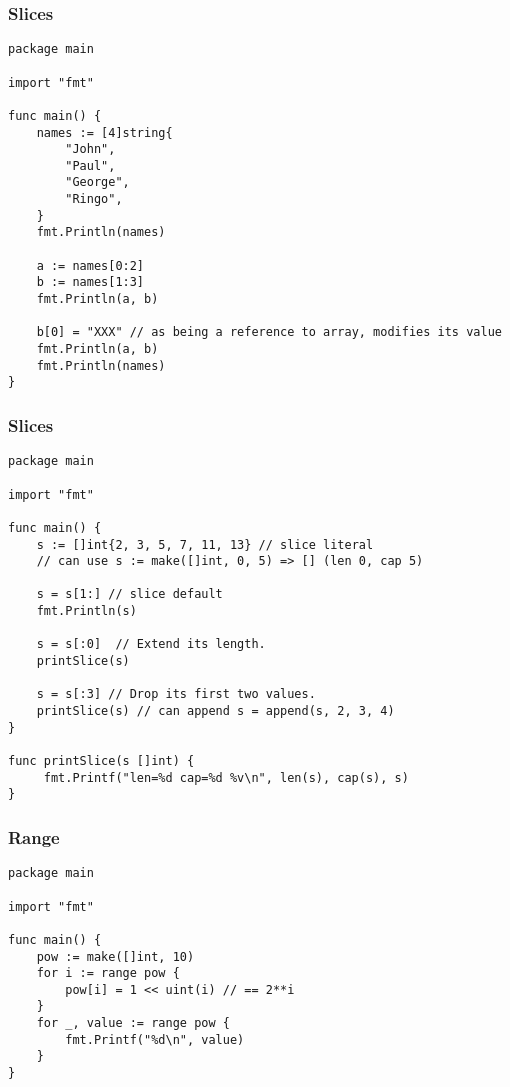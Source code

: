 \begin{frame}[fragile]
\frametitle{Slices}

\begin{lstlisting}
package main

import "fmt"

func main() {
    names := [4]string{
        "John",
        "Paul",
        "George",
        "Ringo",
    }
    fmt.Println(names)

    a := names[0:2]
    b := names[1:3]
    fmt.Println(a, b)

    b[0] = "XXX" // as being a reference to array, modifies its value
    fmt.Println(a, b)
    fmt.Println(names)
}
\end{lstlisting}

\end{frame}


\begin{frame}[fragile]
\frametitle{Slices}

\begin{lstlisting}
package main

import "fmt"

func main() {
    s := []int{2, 3, 5, 7, 11, 13} // slice literal
    // can use s := make([]int, 0, 5) => [] (len 0, cap 5)

    s = s[1:] // slice default
    fmt.Println(s)

    s = s[:0]  // Extend its length.
    printSlice(s)

    s = s[:3] // Drop its first two values.
    printSlice(s) // can append s = append(s, 2, 3, 4)
}

func printSlice(s []int) {
     fmt.Printf("len=%d cap=%d %v\n", len(s), cap(s), s)
}
\end{lstlisting}
\end{frame}


\begin{frame}[fragile]
\frametitle{Range}

\begin{lstlisting}
package main

import "fmt"

func main() {
    pow := make([]int, 10)
    for i := range pow {
        pow[i] = 1 << uint(i) // == 2**i
    }
    for _, value := range pow {
        fmt.Printf("%d\n", value)
    }
}
\end{lstlisting}
\end{frame}


